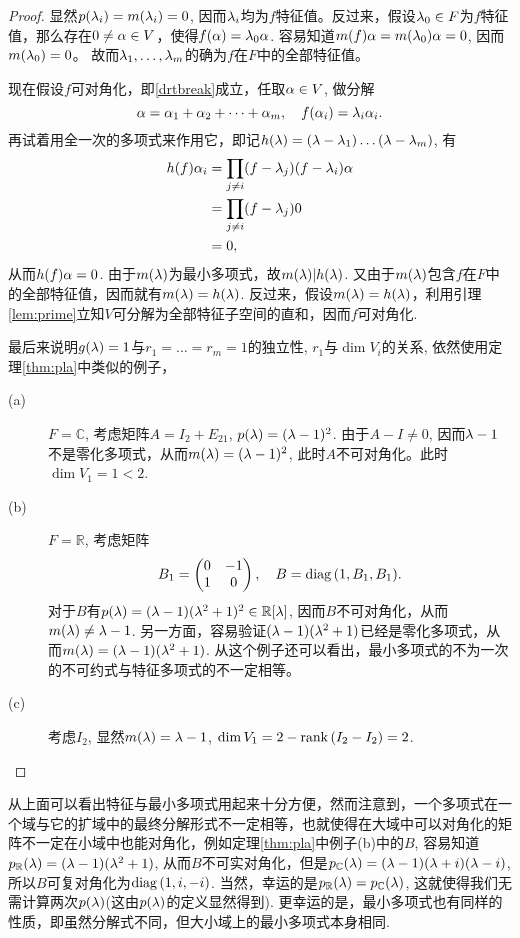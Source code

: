 \begin{proof}
	显然$p(\lambda_i)=m(\lambda_i)=0$, 因而$\lambda_i$均为$f$特征值。反过来，假设$\lambda_0\in F$为$f$特征值，那么存在$0\neq \alpha\in V$，使得$f(\alpha)=\lambda_0\alpha$. 容易知道$m(f)\alpha=m(\lambda_0)\alpha=0$, 因而$m(\lambda_0)=0$。 故而$\lambda_1,\dots,\lambda_m$的确为$f$在$F$中的全部特征值。

	现在假设$f$可对角化，即\eqref{drtbreak}成立，任取$\alpha\in V$, 做分解
	\[\alpha=\alpha_1+\alpha_2+\dots+\alpha_m,\quad f(\alpha_i)=\lambda_i \alpha_i.\]
	再试着用全一次的多项式来作用它，即记$h(\lambda)=(\lambda-\lambda_1)\dots(\lambda-\lambda_m)$, 有
	\begin{align*}
		h(f)\alpha_i&=\prod_{j\neq i}(f-\lambda_j)(f-\lambda_i)\alpha\\
		&=\prod_{j\neq i}(f-\lambda_j)0\\
		&=0,
	\end{align*}
	从而$h(f)\alpha=0$. 由于$m(\lambda)$为最小多项式，故$m(\lambda)|h(\lambda)$. 又由于$m(\lambda)$包含$f$在$F$中的全部特征值，因而就有$m(\lambda)=h(\lambda)$. 反过来，假设$m(\lambda)=h(\lambda)$，利用引理\ref{lem:prime}立知$V$可分解为全部特征子空间的直和，因而$f$可对角化.

	最后来说明$g(\lambda)=1$与$r_1=\dots=r_m=1$的独立性, $r_1$与$\dim V_i$的关系, 依然使用定理\ref{thm:pla}中类似的例子，
	\begin{description}
		\item[(a)] $F=\mathbb{C}$, 考虑矩阵$A=I_2+E_{21}$, $p(\lambda)=(\lambda-1)^2$. 由于$A-I\neq 0$, 因而$\lambda-1$不是零化多项式，从而$m(\lambda)=(\lambda-1)^2$, 此时$A$不可对角化。此时$\dim V_1=1<2$.
		\item[(b)] $F=\mathbb{R}$, 考虑矩阵
		\[B_1=\begin{pmatrix}
			0 & -1\\
			1 & 0
		  \end{pmatrix},\quad
		  B=\operatorname*{diag\,} (1,B_1,B_1).\]
		  对于$B$有$p(\lambda)=(\lambda-1)(\lambda^2+1)^2\in \mathbb{R}[\lambda]$, 因而$B$不可对角化，从而$m(\lambda)\neq \lambda-1$. 另一方面，容易验证$(\lambda-1)(\lambda^2+1)$已经是零化多项式，从而$m(\lambda)=(\lambda-1)(\lambda^2+1)$. 从这个例子还可以看出，最小多项式的不为一次的不可约式与特征多项式的不一定相等。
		\item[(c)] 考虑$I_2$, 显然$m(\lambda)=\lambda-1$, $\dim V_1=2-\operatorname*{rank\,}(I_2-I_2)=2$.
	\end{description}
\end{proof}

从上面可以看出特征与最小多项式用起来十分方便，然而注意到，一个多项式在一个域与它的扩域中的最终分解形式不一定相等，也就使得在大域中可以对角化的矩阵不一定在小域中也能对角化，例如定理\ref{thm:pla}中例子(b)中的$B$, 容易知道$p_{\mathbb{R}}(\lambda)=(\lambda-1)(\lambda^2+1)$, 从而$B$不可实对角化，但是$p_{\mathbb{C}}(\lambda)=(\lambda-1)(\lambda+i)(\lambda-i)$, 所以$B$可复对角化为$\operatorname*{diag\,}(1,i,-i)$. 当然，幸运的是$p_{\mathbb{R}}(\lambda)=p_{\mathbb{C}}(\lambda)$, 这就使得我们无需计算两次$p(\lambda)$(这由$p(\lambda)$的定义显然得到). 更幸运的是，最小多项式也有同样的性质，即虽然分解式不同，但大小域上的最小多项式本身相同.
